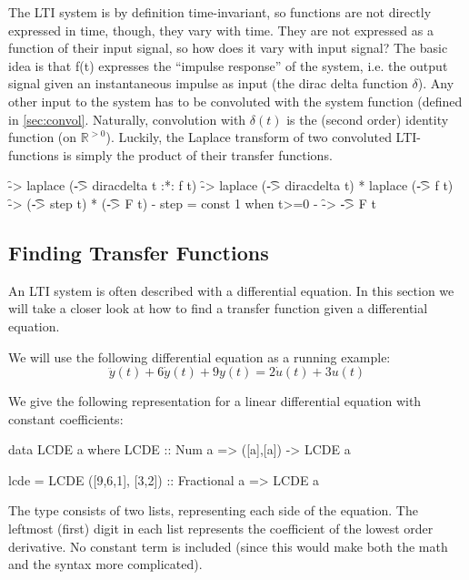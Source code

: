 The LTI system is by definition time-invariant, so functions are not directly expressed in time, though, they vary with time. They are not expressed as a function of their input signal, so how does it vary with input signal? The basic idea is that f(t) expresses the ``impulse response'' of the system, i.e. the output signal given an instantaneous impulse as input (the dirac delta function $\delta$). Any other input to the system has to be convoluted with the system function (defined in \ref{sec:convol}. Naturally, convolution with $\delta(t)$ is the (second order) identity function (on $\mathbb{R}^{>0}$). Luckily, the Laplace transform of two convoluted LTI-functions is simply the product of their transfer functions.

\begin{codeeq}
\f -> laplace (\t -> diracdelta t :*: f t)
\f -> laplace (\t -> diracdelta t) * laplace (\t -> f t)
\f -> (\t -> step t) * (\t -> F t)
{- step = const 1 when t>=0 -}
\f -> \t -> F t
\end{codeeq}



\subsection{Finding Transfer Functions}
An LTI system is often described with a differential equation. In this section we will take a closer look at how to find a transfer function given a differential equation.

We will use the following differential equation as a running example:
\begin{equation*} %
\ddot{y}(t)+6\dot{y}(t)+9y(t)=2\dot{u}(t)+3u(t)
\end{equation*}

We give the following representation for a linear differential equation with
constant coefficients:

\begin{code}
data LCDE a where
  LCDE :: Num a => ([a],[a]) -> LCDE a

lcde = LCDE ([9,6,1], [3,2]) :: Fractional a => LCDE a
\end{code} %
The type consists of two lists, representing each side of the equation. The
leftmost (first) digit in each list represents the coefficient of the lowest order derivative. 
No constant term is included (since this would make both the math and the
syntax more complicated).

